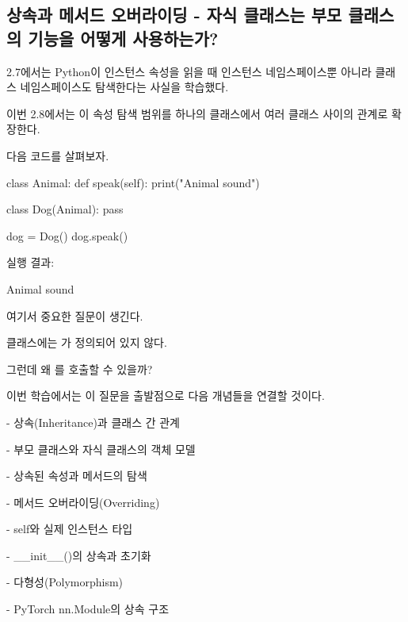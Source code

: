 

\subsection{상속과 메서드 오버라이딩 - 자식 클래스는 부모 클래스의 기능을 어떻게 사용하는가?}

2.7에서는 Python이 인스턴스 속성을 읽을 때 인스턴스 네임스페이스뿐 아니라 클래스 네임스페이스도 탐색한다는 사실을 학습했다.

이번 2.8에서는 이 속성 탐색 범위를 하나의 클래스에서 여러 클래스 사이의 관계로 확장한다.

다음 코드를 살펴보자.

\begin{dhkcode}
class Animal:
    def speak(self):
        print("Animal sound")


class Dog(Animal):
    pass

dog = Dog()
dog.speak()
\end{dhkcode}

실행 결과:

\begin{dhkzsh}
Animal sound
\end{dhkzsh}

여기서 중요한 질문이 생긴다.

 클래스에는 가 정의되어 있지 않다.

그런데 왜 를 호출할 수 있을까?

이번 학습에서는 이 질문을 출발점으로 다음 개념들을 연결할 것이다.

\begin{dhksmry}
    - 상속(Inheritance)과 클래스 간 관계

    - 부모 클래스와 자식 클래스의 객체 모델

    - 상속된 속성과 메서드의 탐색

    - 메서드 오버라이딩(Overriding)

    - self와 실제 인스턴스 타입

    - __init__()의 상속과 초기화

    - 다형성(Polymorphism)

    - PyTorch nn.Module의 상속 구조
\end{dhksmry}


